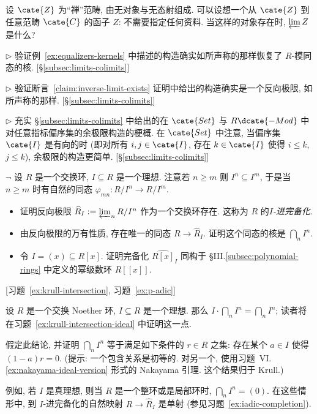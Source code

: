 \begin{prob}\label{ex:zen-category}
设 $\cate{Z}$ 为``禅''范畴, 由无对象与无态射组成. 可以设想一个从 $\cate{Z}$ 到任意范畴 $\cate{C}$ 的函子 $Z$: 不需要指定任何资料. 当这样的对象存在时, $\varprojlim Z$ 是什么?
\end{prob}

\begin{prob}\label{ex:kernel-verify}
$\triangleright$ 验证例~\ref{ex:equalizers-kernels} 中描述的构造确实如所声称的那样恢复了 $R$-模同态的核. [\S\ref{subsec:limits-colimits}]
\end{prob}

\begin{prob}\label{ex:inverse-limit-verify}
$\triangleright$ 验证断言~\ref{claim:inverse-limit-exists} 证明中给出的构造确实是一个反向极限, 如所声称的那样. [\S\ref{subsec:limits-colimits}]
\end{prob}

\begin{prob}\label{ex:colimit-verify}
$\triangleright$ 充实 §\ref{subsec:limits-colimits} 中给出的在 $\cate{Set}$ 与 $R\dcate{-Mod}$ 中对任意指标偏序集的余极限构造的梗概. 在 $\cate{Set}$ 中注意, 当偏序集 $\cate{I}$ 是有向的时 (即对所有 $i,j\in\cate{I}$, 存在 $k\in\cate{I}$ 使得 $i\leq k$, $j\leq k$), 余极限的构造更简单. [\S\ref{subsec:limits-colimits}]
\end{prob}

\begin{prob}\label{ex:iadic-completion}
$\neg$ 设 $R$ 是一个交换环, $I\subseteq R$ 是一个理想. 注意若 $n\geq m$ 则 $I^n\subseteq I^m$, 于是当 $n\geq m$ 时有自然的同态 $\varphi_{mn}:R/I^n\to R/I^m$.

\begin{itemize}
\item 证明反向极限 $\widehat{R}_I:=\varprojlim_n R/I^n$ 作为一个交换环存在. 这称为 $R$ 的\emph{$I$-进完备化}.
\item 由反向极限的万有性质, 存在唯一的同态 $R\to\widehat{R}_I$. 证明这个同态的核是 $\bigcap_n I^n$.
\item 令 $I=(x)\subseteq R[x]$. 证明完备化 $\widehat{R[x]}_I$ 同构于 §III.\ref{subsec:polynomial-rings} 中定义的幂级数环 $R[[x]]$.
\end{itemize}
[习题~\ref{ex:krull-intersection}, 习题~\ref{ex:p-adic}]
\end{prob}

\begin{prob}\label{ex:krull-intersection}
设 $R$ 是一个交换 Noether 环, $I\subseteq R$ 是一个理想. 那么 $I\cdot\bigcap_n I^n=\bigcap_n I^n$; 读者将在习题~\ref{ex:krull-intersection-ideal} 中证明这一点.

假定此结论, 并证明 $\bigcap_n I^n$ 等于满足如下条件的 $r\in R$ 之集: 存在某个 $a\in I$ 使得 $(1-a)r=0$. (提示: 一个包含关系是初等的. 对另一个, 使用习题~VI.\ref{ex:nakayama-ideal-version} 形式的 Nakayama 引理. 这个结果归于 Krull.)

例如, 若 $I$ 是真理想, 则当 $R$ 是一个整环或是局部环时, $\bigcap_n I^n=(0)$. 在这些情形中, 到 $I$-进完备化的自然映射 $R\to\widehat{R}_I$ 是单射 (参见习题~\ref{ex:iadic-completion}).
\end{prob}


